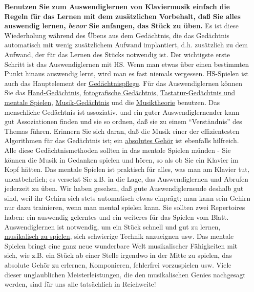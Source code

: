 \textbf{Benutzen Sie zum Auswendiglernen von Klaviermusik einfach die Regeln für das Lernen mit dem zusätzlichen Vorbehalt, daß Sie alles auswendig lernen, \textit{bevor} Sie anfangen, das Stück zu üben.}
Es ist diese Wiederholung während des Übens aus dem Gedächtnis, die das Gedächtnis automatisch mit wenig zusätzlichem Aufwand implantiert, d.h. zusätzlich zu dem Aufwand, der für das Lernen des Stücks notwendig ist.
Der wichtigste erste Schritt ist das Auswendiglernen mit HS.
Wenn man etwas über einen bestimmten Punkt hinaus auswendig lernt, wird man es fast niemals vergessen.
HS-Spielen ist auch das Hauptelement der \hyperlink{c1iii6k}{Gedächtnispflege}.
Für das Auswendiglernen können Sie das \hyperlink{c1iii6hand}{Hand-Gedächtnis}, \hyperlink{c1iii6foto}{fotografische Gedächtnis}, \hyperlink{c1iii6tastatur}{Tastatur-Gedächtnis und mentale Spielen}, \hyperlink{c1iii6musik}{Musik-Gedächtnis} und die \hyperlink{c1iii6theorie}{Musiktheorie} benutzen.
Das menschliche Gedächtnis ist assoziativ, und ein guter Auswendiglernender kann gut Assoziationen finden und sie so ordnen, daß sie zu einem \enquote{Verständnis} des Themas führen.
Erinnern Sie sich daran, daß die Musik einer der effizientesten Algorithmen für das Gedächtnis ist; ein \hyperlink{c1iii12}{absolutes Gehör} ist ebenfalls hilfreich.
Alle diese Gedächtnismethoden sollten in das mentale Spielen münden - Sie können die Musik in Gedanken spielen und hören, so als ob Sie ein Klavier im Kopf hätten.
Das mentale Spielen ist praktisch für alles, was man am Klavier tut, unentbehrlich; es versetzt Sie z.B. in die Lage, das Auswendiglernen und Abrufen jederzeit zu üben.
Wir haben gesehen, daß gute Auswendiglernende deshalb gut sind, weil ihr Gehirn sich stets automatisch etwas einprägt; man kann sein Gehirn nur dazu trainieren, wenn man mental spielen kann.
Sie sollten zwei Repertoires haben: ein auswendig gelerntes und ein weiteres für das Spielen vom Blatt.
Auswendiglernen ist notwendig, um ein Stück schnell und gut zu lernen, \hyperlink{c1iii14d}{musikalisch zu spielen}, sich schwierige Technik anzueignen usw.
Das mentale Spielen bringt eine ganz neue wunderbare Welt musikalischer Fähigkeiten mit sich, wie z.B. ein  Stück ab einer Stelle irgendwo in der Mitte zu spielen, das absolute Gehör zu erlernen, Komponieren, fehlerfrei vorzuspielen usw.
Viele dieser unglaublichen Meisterleistungen, die den musikalischen Genies nachgesagt werden, sind für uns alle tatsächlich in Reichweite!



